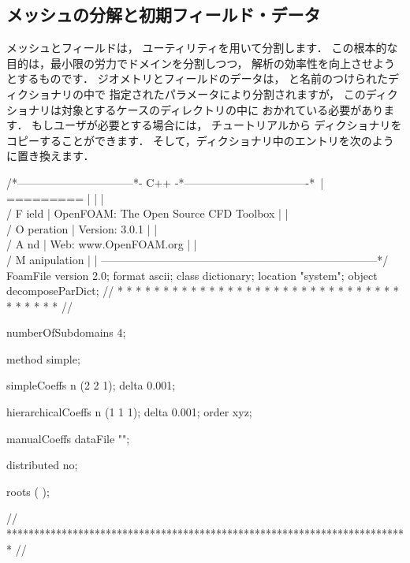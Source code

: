 \subsection{メッシュの分解と初期フィールド・データ}
\label{ssec:3.4.1}
%
%
%
%
メッシュとフィールドは，
%
%
ユーティリティを用いて分割します．
この根本的な目的は，最小限の労力でドメインを分割しつつ，
解析の効率性を向上させようとするものです．
ジオメトリとフィールドのデータは，
%
%
と名前のつけられたディクショナリの中で
指定されたパラメータにより分割されますが，
このディクショナリは対象とするケースのディレクトリの中に
おかれている必要があります．
もしユーザが必要とする場合には，
チュートリアルから
ディクショナリをコピーすることができます．
そして，ディクショナリ中のエントリを次のように置き換えます．
\begin{OFverbatim}[file, linenum=17]
/*--------------------------------*- C++ -*----------------------------------*\
| =========                 |                                                 |
| \\      /  F ield         | OpenFOAM: The Open Source CFD Toolbox           |
|  \\    /   O peration     | Version:  3.0.1                                 |
|   \\  /    A nd           | Web:      www.OpenFOAM.org                      |
|    \\/     M anipulation  |                                                 |
\*---------------------------------------------------------------------------*/
FoamFile
{
    version     2.0;
    format      ascii;
    class       dictionary;
    location    "system";
    object      decomposeParDict;
}
// * * * * * * * * * * * * * * * * * * * * * * * * * * * * * * * * * * * * * //

numberOfSubdomains 4;

method          simple;

simpleCoeffs
{
    n               (2 2 1);
    delta           0.001;
}

hierarchicalCoeffs
{
    n               (1 1 1);
    delta           0.001;
    order           xyz;
}

manualCoeffs
{
    dataFile        "";
}

distributed     no;

roots           ( );


// ************************************************************************* //
\end{OFverbatim}
